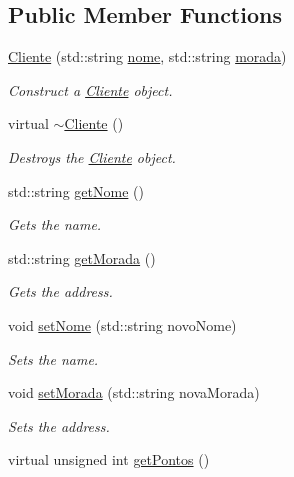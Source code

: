 \subsection*{Public Member Functions}
\begin{DoxyCompactItemize}
\item 
\hyperlink{classCliente_a1abb2c2f087c730f2c3afa8df2f70925}{Cliente} (std\+::string \hyperlink{classCliente_aaa79b0a26f7d5d007fe4ae9696564ca5}{nome}, std\+::string \hyperlink{classCliente_a24ba6895be9bdf5112e9e67a34d13704}{morada})
\begin{DoxyCompactList}\small\item\em Construct a \hyperlink{classCliente}{Cliente} object. \end{DoxyCompactList}\item 
virtual \hyperlink{classCliente_ae3fcc70b9461c776eaf5f38100c5ac6b}{$\sim$\+Cliente} ()
\begin{DoxyCompactList}\small\item\em Destroys the \hyperlink{classCliente}{Cliente} object. \end{DoxyCompactList}\item 
std\+::string \hyperlink{classCliente_a09b99b4140f32bdd3bf486cc2ac5ee27}{get\+Nome} ()
\begin{DoxyCompactList}\small\item\em Gets the name. \end{DoxyCompactList}\item 
std\+::string \hyperlink{classCliente_a7f69a0a6ffad90dc0282d7dd9d5cb994}{get\+Morada} ()
\begin{DoxyCompactList}\small\item\em Gets the address. \end{DoxyCompactList}\item 
void \hyperlink{classCliente_a008bf4cc277a8ba5f9c58e0f4f622872}{set\+Nome} (std\+::string novo\+Nome)
\begin{DoxyCompactList}\small\item\em Sets the name. \end{DoxyCompactList}\item 
void \hyperlink{classCliente_ab7ca2f6f7003324274cb460448333dd0}{set\+Morada} (std\+::string nova\+Morada)
\begin{DoxyCompactList}\small\item\em Sets the address. \end{DoxyCompactList}\item 
virtual unsigned int \hyperlink{classCliente_a4bcd51f0d9a0bfe7d9d47074ac4e65de}{get\+Pontos} ()

\end{DoxyCompactItemize}

